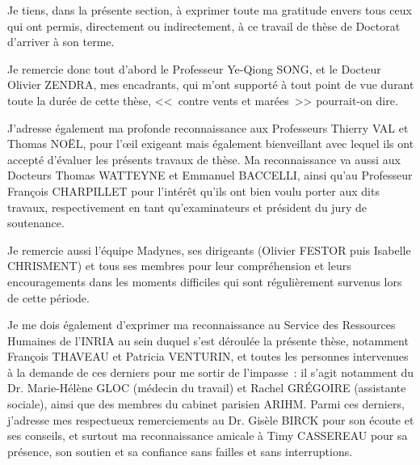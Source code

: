 

\begin{ThesisAcknowledgments}

Je tiens, dans la présente section, à exprimer toute ma gratitude envers
tous ceux qui ont permis, directement ou indirectement, à ce travail de
thèse de Doctorat d'arriver à son terme.

\smallskip

Je remercie donc tout d'abord le Professeur Ye-Qiong SONG, et le Docteur
Olivier ZENDRA, mes encadrants, qui m'ont supporté à tout point de vue durant
toute la durée de cette thèse, <<~contre vents et marées~>> pourrait-on dire.

J'adresse également ma profonde reconnaissance aux Professeurs Thierry VAL
et Thomas NO\"EL, pour l'{\oe}il exigeant mais également bienveillant avec
lequel ils ont accepté d'évaluer les présents travaux de thèse.
Ma reconnaissance va aussi aux Docteurs Thomas WATTEYNE et Emmanuel BACCELLI,
ainsi qu'au Professeur François CHARPILLET pour l'intérêt qu'ils ont bien
voulu porter aux dits travaux, respectivement en tant qu'examinateurs et
président du jury de soutenance.

\smallskip

Je remercie aussi l'équipe Madynes, ses dirigeants (Olivier FESTOR puis
Isabelle CHRISMENT) et tous ses membres pour leur compréhension et leurs
encouragements dans les moments difficiles qui sont régulièrement survenus
lors de cette période.

Je me dois également d'exprimer ma reconnaissance au Service des Ressources
Humaines de l'INRIA au sein duquel s'est déroulée la présente thèse,
notamment François THAVEAU et Patricia VENTURIN, et toutes les personnes
intervenues à la demande de ces derniers pour me sortir de l'impasse~:
il s'agit notamment du Dr. Marie-Hélène GLOC (médecin du travail) et Rachel
GRÉGOIRE (assistante sociale), ainsi que des membres du cabinet parisien
ARIHM. Parmi ces derniers, j'adresse mes respectueux remerciements au Dr.
Gisèle BIRCK pour son écoute et ses conseils, et surtout ma reconnaissance
amicale à Timy CASSEREAU pour sa présence, son soutien et sa confiance
sans failles et sans interruptions.


\end{ThesisAcknowledgments}
